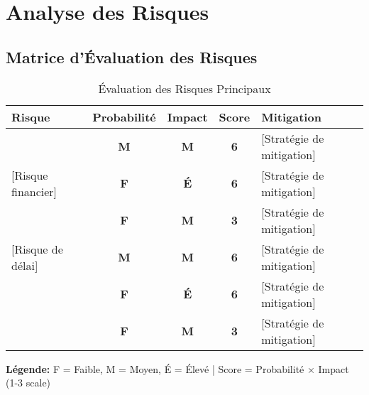 
\section{Analyse des Risques}

\subsection{Matrice d'Évaluation des Risques}

\begin{table}[H]
\centering
\caption{Évaluation des Risques Principaux}
\label{tab:risk-matrix}
\begin{tabular}{|p{}|c|c|c|p{}|}
\hline
\rowcolor{DollaramaGreen!30}
\textbf{\color{white}Risque} & 
\textbf{\color{white}Probabilité} & 
\textbf{\color{white}Impact} & 
\textbf{\color{white}Score} & 
\textbf{\color{white}Mitigation} \\
\hline
[Risque technique] & \cellcolor{yellow!50}\textbf{M} & \cellcolor{yellow!50}\textbf{M} & \cellcolor{yellow!50}\textbf{6} & [Stratégie de mitigation] \\
\hline
\rowcolor{gray!10}
[Risque financier] & \cellcolor{green!30}\textbf{F} & \cellcolor{red!30}\textbf{É} & \cellcolor{yellow!50}\textbf{6} & [Stratégie de mitigation] \\
\hline
[Risque opérationnel] & \cellcolor{green!30}\textbf{F} & \cellcolor{yellow!50}\textbf{M} & \cellcolor{green!30}\textbf{3} & [Stratégie de mitigation] \\
\hline
\rowcolor{gray!10}
[Risque de délai] & \cellcolor{yellow!50}\textbf{M} & \cellcolor{yellow!50}\textbf{M} & \cellcolor{yellow!50}\textbf{6} & [Stratégie de mitigation] \\
\hline
[Risque organisationnel] & \cellcolor{green!30}\textbf{F} & \cellcolor{red!30}\textbf{É} & \cellcolor{yellow!50}\textbf{6} & [Stratégie de mitigation] \\
\hline
[Risque externe] & \cellcolor{green!30}\textbf{F} & \cellcolor{yellow!50}\textbf{M} & \cellcolor{green!30}\textbf{3} & [Stratégie de mitigation] \\
\hline
\end{tabular}
\end{table}

\textbf{Légende:} F = Faible, M = Moyen, É = Élevé | Score = Probabilité × Impact (1-3 scale)


